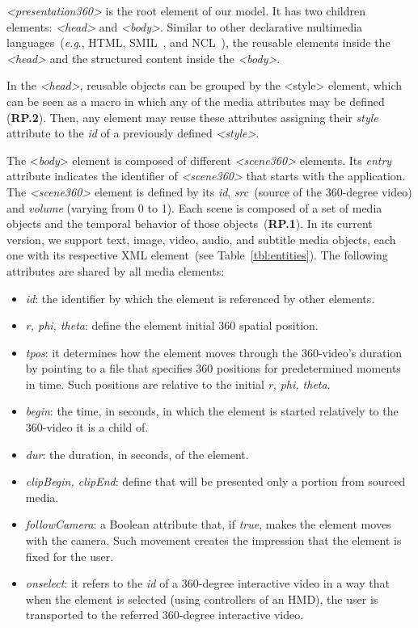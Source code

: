 \emph{<presentation360>} is the root element of our model. It has two children elements: \emph{<head>} and \emph{<body>}. Similar to other declarative multimedia languages~(\emph{e.g}., HTML, SMIL~\cite{ayers2001synchronized}, and NCL~\cite{soares2006nested}), the reusable elements inside the \emph{<head>} and the structured content inside the \emph{<body>}.

In the \emph{<head>},  reusable objects can be grouped by the <style> element, which can be seen as a macro in which any of the media attributes may be defined (\textbf{RP.2}). Then, any element may reuse these attributes assigning their \emph{style} attribute to the \emph{id} of a previously defined \emph{<style>}.

The <\emph{body}> element is composed of different \emph{\emph{<scene360>}} elements. Its \emph{entry} attribute indicates the identifier of \textit{<scene360>} that starts with the application. The \emph{<scene360>} element is defined by its \emph{id}, \emph{src}~(source of the 360-degree video) and \emph{volume} (varying from 0 to 1). Each scene is composed of a set of media objects and the temporal behavior of those objects~(\textbf{RP.1}). In its current version, we support text, image, video, audio, and subtitle media objects, each one with its respective XML element~(see Table~\ref{tbl:entities}). The following attributes are shared by all media elements:

\begin{itemize}
  \item \emph{id}: the identifier by which the element is referenced by other elements.
  \item \emph{r, phi, theta}: define the element initial 360 spatial position.
  \item \emph{tpos}: it determines how the element moves through the 360-video's duration by pointing to a file that specifies 360 positions for predetermined moments in time. Such positions are relative to the initial \emph{r, phi, theta}.    
  \item \emph{begin}: the time, in seconds, in which the element is started relatively to the 360-video it is a child of.
  \item \emph{dur}: the duration, in seconds, of the element.
  \item \emph{clipBegin, clipEnd}: define that will be presented only a portion from sourced media.
  \item \emph{followCamera}: a Boolean attribute that, if \emph{true}, makes the element moves with the camera. Such movement creates the impression that the element is fixed for the user.
  \item \emph{onselect}: it refers to the \emph{id} of a 360-degree interactive video in a way that when the element is selected (using controllers of an HMD), the user is transported to the referred 360-degree interactive video.
\end{itemize}

